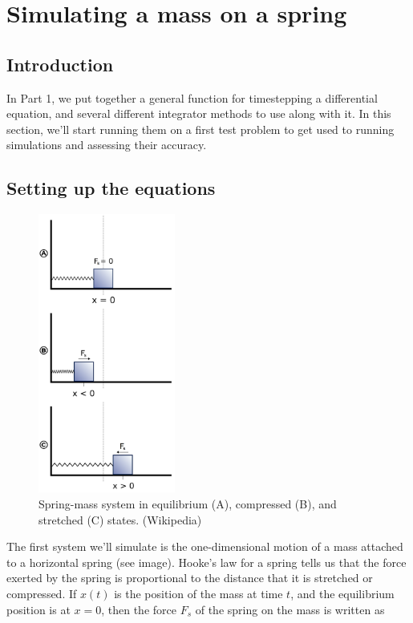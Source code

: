 \documentclass[main.tex]{subfiles}
\begin{document}
\chapter{Simulating a mass on a spring}

\section{Introduction}

In Part 1, we put together a general function for timestepping a differential equation, and several different integrator methods to use along with it.
In this section, we'll start running them on a first test problem to get used to running simulations and assessing their accuracy.

\section{Setting up the equations}

\begin{figure}
\centering
\includegraphics[width=0.4\textwidth]{images/mass}
\caption{Spring-mass system in equilibrium (A), compressed (B), and stretched (C) states. (Wikipedia)}
\end{figure}

The first system we'll simulate is the one-dimensional motion of a mass attached to a horizontal spring (see image).
Hooke's law for a spring tells us that the force exerted by the spring is proportional to the distance that it is stretched or compressed.
If $x(t)$ is the position of the mass at time $t$, and the equilibrium position is at $x=0$, then the force $F_s$ of the spring on the mass is written as
\end{document}

